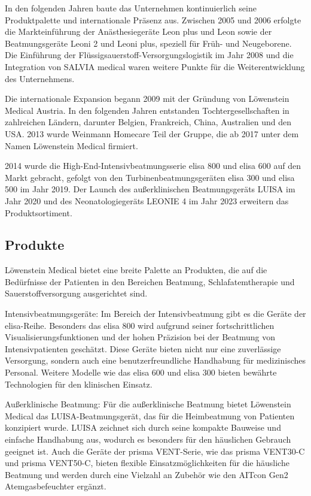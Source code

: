 \documentclass[a4paper, 12pt]{article}
\begin{document}
In den folgenden Jahren baute das Unternehmen kontinuierlich seine Produktpalette und internationale Präsenz aus. Zwischen 2005 und 2006 erfolgte die Markteinführung der Anästhesiegeräte Leon plus und Leon sowie der Beatmungsgeräte Leoni 2 und Leoni plus, speziell für Früh- und Neugeborene. Die Einführung der Flüssigsauerstoff-Versorgungslogistik im Jahr 2008 und die Integration von SALVIA medical waren weitere Punkte für die Weiterentwicklung des Unternehmens.

Die internationale Expansion begann 2009 mit der Gründung von Löwenstein Medical Austria. In den folgenden Jahren entstanden Tochtergesellschaften in zahlreichen Ländern, darunter Belgien, Frankreich, China, Australien und den USA. 2013 wurde Weinmann Homecare Teil der Gruppe, die ab 2017 unter dem Namen Löwenstein Medical firmiert.

2014 wurde die High-End-Intensivbeatmungsserie elisa 800 und elisa 600 auf den Markt gebracht, gefolgt von den Turbinenbeatmungsgeräten elisa 300 und elisa 500 im Jahr 2019. Der Launch des außerklinischen Beatmungsgeräts LUISA im Jahr 2020 und des Neonatologiegeräts LEONIE 4 im Jahr 2023 erweitern das Produktsortiment. \cite{loewenstein}


\subsection{Produkte}\label{products} %

Löwenstein Medical bietet eine breite Palette an Produkten, die auf die Bedürfnisse der Patienten  in den Bereichen Beatmung, Schlafatemtherapie und Sauerstoffversorgung ausgerichtet sind.

Intensivbeatmungsgeräte:
Im Bereich der Intensivbeatmung gibt es die Geräte der elisa-Reihe. Besonders das elisa 800 wird aufgrund seiner fortschrittlichen Visualisierungsfunktionen und der hohen Präzision bei der Beatmung von Intensivpatienten geschätzt. Diese Geräte bieten nicht nur eine zuverlässige Versorgung, sondern auch eine benutzerfreundliche Handhabung für medizinisches Personal. Weitere Modelle wie das elisa 600 und elisa 300 bieten bewährte Technologien für den klinischen Einsatz.

Außerklinische Beatmung:
Für die außerklinische Beatmung bietet Löwenstein Medical das LUISA-Beatmungsgerät, das für die Heimbeatmung von Patienten konzipiert wurde. LUISA zeichnet sich durch seine kompakte Bauweise und einfache Handhabung aus, wodurch es besonders für den häuslichen Gebrauch geeignet ist. Auch die Geräte der prisma VENT-Serie, wie das prisma VENT30-C und prisma VENT50-C, bieten flexible Einsatzmöglichkeiten für die häusliche Beatmung und werden durch eine Vielzahl an Zubehör wie den AITcon Gen2 Atemgasbefeuchter ergänzt.
\end{document}
